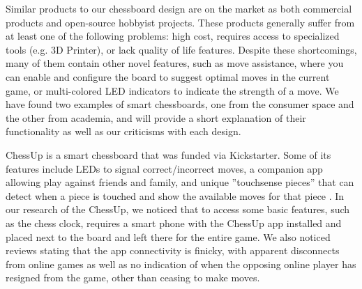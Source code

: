 \documentclass[11pt,journal]{IEEEtran}
\begin{document}
Similar products to our chessboard design are on the market as both commercial products and open-source hobbyist projects. These products generally suffer from at least one of the following problems: high cost, requires access to specialized tools (e.g. 3D Printer), or lack quality of life features. Despite these shortcomings, many of them contain other novel features, such as move assistance, where you can enable and configure the board to suggest optimal moves in the current game, or multi-colored LED indicators to indicate the strength of a move. We have found two examples of smart chessboards, one from the consumer space and the other from academia, and will provide a short explanation of their functionality as well as our criticisms with each design.




ChessUp is a smart chessboard that was funded via Kickstarter. Some of its features include LEDs to signal correct/incorrect moves, a companion app allowing play against friends and family, and unique ''touchsense pieces'' that can detect when a piece is touched and show the available moves for that piece \cite{chessup}. In our research of the ChessUp, we noticed that to access some basic features, such as the chess clock, requires a smart phone with the ChessUp app installed and placed next to the board and left there for the entire game. We also noticed reviews stating that the app connectivity is finicky, with apparent disconnects from online games as well as no indication of when the opposing online player has resigned from the game, other than ceasing to make moves.
\end{document}
